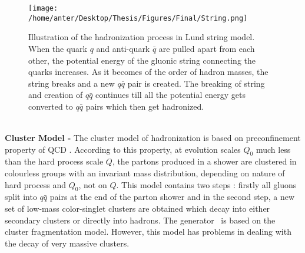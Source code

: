 \begin{figure}[!h]
\begin{center}
\hspace*{-4mm}
\texttt{[image: /home/anter/Desktop/Thesis/Figures/Final/String.png]}\\
\vspace*{4mm}
\caption[Illustration of the hadronization process in Lund string model.]{Illustration of the hadronization process in Lund string model\footnotemark. When the quark $q$ and anti-quark $\bar{q}$ are pulled apart from each other, the potential energy of the gluonic string connecting the quarks increases. As it becomes of the order of hadron masses, the string breaks and a new $q\bar{q}$ pair is created. The breaking of string and creation of $q\bar{q}$ continues till all the potential energy gets converted to $q\bar{q}$ pairs which then get hadronized.}
\label{fig:string}
\end{center}
\end{figure} \\ \newline
{\bf Cluster Model -} The cluster model of hadronization \cite{Marchesini:1987cf,Webber:1983if} is based on preconfinement property of QCD \cite{Amati:1979fg}. According to this property, at evolution scales $Q_0$ much less than the hard process scale $Q$, the partons produced in a shower are clustered in colourless groups with an invariant mass distribution, depending on nature of hard process and $Q_0$, not on $Q$. This model contains two steps : firstly all gluons split into $q\bar{q}$ pairs at the end of the parton shower and in the second step, a new set of low-mass color-singlet clusters are obtained which decay into either secondary clusters or directly into hadrons. The generator \HERWIG~is based on the cluster fragmentation model. However, this model has problems in dealing with the decay of very massive clusters. 

